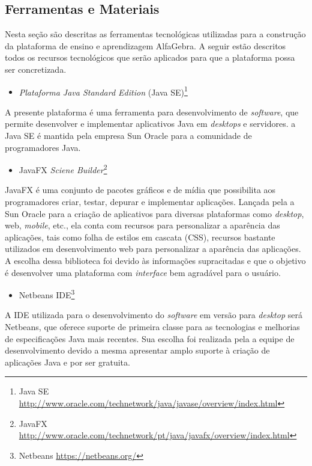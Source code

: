 \subsection{Ferramentas e Materiais}
\noindent Nesta seção são descritas as ferramentas tecnológicas utilizadas para a construção da plataforma de ensino e aprendizagem AlfaGebra. A seguir estão descritos todos os recursos tecnológicos que serão aplicados para que a plataforma possa ser concretizada.

\begin{itemize}
    \item \textit{Plataforma Java Standard Edition} (Java SE)\footnote[10]{Java SE \url{http://www.oracle.com/technetwork/java/javase/overview/index.html}}
\end{itemize}
\noindent A presente plataforma é uma ferramenta para desenvolvimento de \textit{software}, que permite desenvolver e implementar aplicativos Java em \textit{desktops} e servidores. a Java SE é mantida pela empresa Sun Oracle para a comunidade de programadores Java.

\begin{itemize}
    \item JavaFX \textit{Sciene Builder}\footnote[11]{JavaFX \url{http://www.oracle.com/technetwork/pt/java/javafx/overview/index.html}}
\end{itemize}
\noindent JavaFX é uma conjunto de pacotes gráficos e de mídia que possibilita aos programadores criar, testar, depurar e implementar aplicações. Lançada pela a Sun Oracle para a criação de aplicativos para diversas plataformas como \textit{desktop}, web, \textit{mobile}, etc., ela conta com recursos para personalizar a aparência das aplicações, tais como folha de estilos em cascata (CSS), recursos bastante utilizados em desenvolvimento web para personalizar a aparência das aplicações. A escolha dessa biblioteca foi devido às informações supracitadas e que o objetivo é desenvolver uma plataforma com \textit{interface} bem agradável para o usuário.

\begin{itemize}
    \item Netbeans IDE\footnote[12]{Netbeans \url{https://netbeans.org/}}
\end{itemize}
A IDE utilizada para o desenvolvimento do \textit{software} em versão para \textit{desktop} será Netbeans, que oferece suporte de primeira classe para as tecnologias e melhorias de especificações Java mais recentes. Sua escolha foi realizada pela a equipe de desenvolvimento devido a mesma apresentar amplo suporte à criação de aplicações Java e por ser gratuita.


